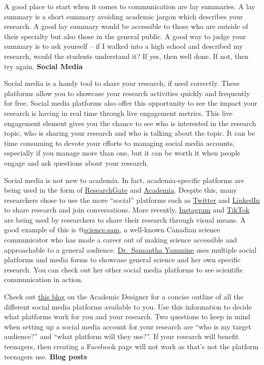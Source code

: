 \documentclass[
]{book}
\begin{document}
A good place to start when it comes to communication are lay summaries. A lay summary is a short summary avoiding academic jargon which describes your research. A good lay summary would be accessible to those who are outside of their specialty but also those in the general public. A good way to judge your summary is to ask yourself -- if I walked into a high school and described my research, would the students understand it? If yes, then well done. If not, then try again. \textbf{Social Media}

Social media is a handy tool to share your research, if used correctly. These platforms allow you to showcase your research activities quickly and frequently for free. Social media platforms also offer this opportunity to see the impact your research is having in real time through live engagement metrics. This live engagement element gives you the chance to see who is interested in the research topic, who is sharing your research and who is talking about the topic. It can be time consuming to devote your efforts to managing social media accounts, especially if you manage more than one, but it can be worth it when people engage and ask questions about your research.

Social media is not new to academia. In fact, academia-specific platforms are being used in the form of \href{https://www.researchgate.net/}{ResearchGate} and \href{https://www.academia.edu/}{Academia}. Despite this, many researchers chose to use the more ``social'' platforms such as \href{http://www.twitter.com/}{Twitter} and \href{http://www.linkedin.com/}{LinkedIn} to share research and join conversations. More recently, \href{http://www.instagram.com/}{Instagram} and \href{https://www.tiktok.com/en}{TikTok} are being used by researchers to share their research through visual means. A good example of this is @\href{https://www.instagram.com/science.sam/}{science.sam}, a well-known Canadian science communicator who has made a career out of making science accessible and approachable to a general audience. \href{https://www.samanthayammine.com/}{Dr.~Samantha Yammine} uses multiple social platforms and media forms to showcase general science and her own specific research. You can check out her other social media platforms to see scientific communication in action.

Check out \href{https://theacademicdesigner.com/2019/social-media-platforms/}{this blog} on the Academic Designer for a concise outline of all the different social media platforms available to you. Use this information to decide what platforms work for you and your research. Two questions to keep in mind when setting up a social media account for your research are ``who is my target audience?'' and ``what platform will they use?''. If your research will benefit teenagers, then creating a Facebook page will not work as that's not the platform teenagers use. \textbf{Blog posts}
\end{document}
